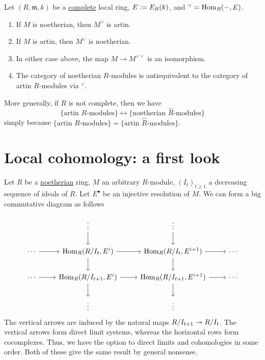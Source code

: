 \documentclass[12pt]{article}
\begin{document}
\begin{thm} \label{thm:matlis-duality}
	Let $(R, \mathfrak{m}, k)$ be a \underline{complete} local ring, $E \vcentcolon= E_{R}(k)$, and $^{\vee} = \operatorname{Hom}_{R}(-, E)$. 
	\begin{enumerate}[label=(\alph*)]
		\item If $M$ is noetherian, then $M^{\vee}$ is artin.
		\item If $M$ is artin, then $M^{\vee}$ is noetherian.
		\item In either case above, the map $M \to M^{\vee \vee}$ is an isomorphism.
		\item The category of noetherian $R$-modules is antiequivalent to the category of artin $R$-modules via $^{\vee}$.
	\end{enumerate}

	More generally, if $R$ is not complete, then we have
	\begin{equation*} 
		\{\text{artin $R$-modules}\} \leftrightarrow \{\text{noetherian $\widehat{R}$-modules}\}
	\end{equation*}
	simply because $\{\text{artin $R$-modules}\} = \{\text{artin $\hat{R}$-modules}\}$.
\end{thm}

\section{Local cohomology: a first look}

Let $R$ be a \underline{noetherian} ring, $M$ an arbitrary $R$-module, $(I_{t})_{t \ge 1}$ a decreasing sequence of ideals of $R$. Let $E^{\bullet}$ be an injective resolution of $M$. We can form a big commutative diagram as follows

\begin{equation*} 
	\begin{tikzcd}
         & \vdots \arrow[d]                                 & \vdots \arrow[d]                                   &        \\
		\cdots \arrow[r] & {\Hom_{R}(R/I_{t}, E^{i})} \arrow[d] \arrow[r]   & {\Hom_{R}(R/I_{t}, E^{i+1})} \arrow[d] \arrow[r]   & \cdots \\
		\cdots \arrow[r] & {\Hom_{R}(R/I_{t+1}, E^{i})} \arrow[r] \arrow[d] & {\Hom_{R}(R/I_{t+1}, E^{i+1})} \arrow[r] \arrow[d] & \cdots \\
                 & \vdots                                           & \vdots                                             &       
\end{tikzcd}		
\end{equation*}
The vertical arrows are induced by the natural maps $R/I_{t + 1} \twoheadrightarrow R/I_{t}$. The vertical arrows form direct limit systems, whereas the horizontal rows form cocomplexes. Thus, we have the option to direct limits and cohomologies in some order. Both of these give the same result by general nonsense. 
\end{document}

